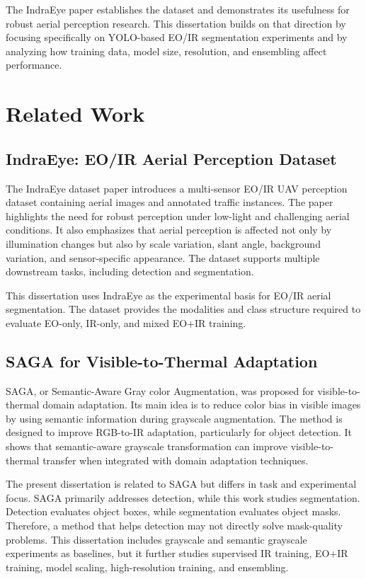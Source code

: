 The IndraEye paper establishes the dataset and demonstrates its usefulness for robust aerial perception research. This dissertation builds on that direction by focusing specifically on YOLO-based EO/IR segmentation experiments and by analyzing how training data, model size, resolution, and ensembling affect performance.

\section{Related Work}

\subsection{IndraEye: EO/IR Aerial Perception Dataset}

The IndraEye dataset paper introduces a multi-sensor EO/IR UAV perception dataset containing aerial images and annotated traffic instances. The paper highlights the need for robust perception under low-light and challenging aerial conditions. It also emphasizes that aerial perception is affected not only by illumination changes but also by scale variation, slant angle, background variation, and sensor-specific appearance. The dataset supports multiple downstream tasks, including detection and segmentation.

This dissertation uses IndraEye as the experimental basis for EO/IR aerial segmentation. The dataset provides the modalities and class structure required to evaluate EO-only, IR-only, and mixed EO+IR training.

\subsection{SAGA for Visible-to-Thermal Adaptation}

SAGA, or Semantic-Aware Gray color Augmentation, was proposed for visible-to-thermal domain adaptation. Its main idea is to reduce color bias in visible images by using semantic information during grayscale augmentation. The method is designed to improve RGB-to-IR adaptation, particularly for object detection. It shows that semantic-aware grayscale transformation can improve visible-to-thermal transfer when integrated with domain adaptation techniques.

The present dissertation is related to SAGA but differs in task and experimental focus. SAGA primarily addresses detection, while this work studies segmentation. Detection evaluates object boxes, while segmentation evaluates object masks. Therefore, a method that helps detection may not directly solve mask-quality problems. This dissertation includes grayscale and semantic grayscale experiments as baselines, but it further studies supervised IR training, EO+IR training, model scaling, high-resolution training, and ensembling.

